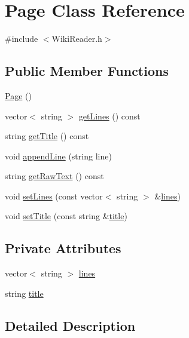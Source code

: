 \hypertarget{classPage}{\section{\-Page \-Class \-Reference}
\label{classPage}
}


{\ttfamily \#include $<$\-Wiki\-Reader.\-h$>$}

\subsection*{\-Public \-Member \-Functions}
\begin{DoxyCompactItemize}
\item 
\hyperlink{classPage_a9a7cc22d5459498ce638c54ae966c79b}{\-Page} ()
\item 
vector$<$ string $>$ \hyperlink{classPage_a89006da4b880814d0db9b994c16735a5}{get\-Lines} () const 
\item 
string \hyperlink{classPage_ad4f5e1a904a12846407e8d6ee47ddc2e}{get\-Title} () const 
\item 
void \hyperlink{classPage_a85107eca1e3f7b60bc7d0ec0283711a5}{append\-Line} (string line)
\item 
string \hyperlink{classPage_a01d4002343ca3af72cab2637778942cb}{get\-Raw\-Text} () const 
\item 
void \hyperlink{classPage_a81de048799400e4ae1b5cf2edf0b3570}{set\-Lines} (const vector$<$ string $>$ \&\hyperlink{classPage_a2a3c7d2eacadd5d336a1ff4ff771c2cc}{lines})
\item 
void \hyperlink{classPage_a79a7a53a17d2366feb75f4caac659a2a}{set\-Title} (const string \&\hyperlink{classPage_a2c1c007130225cc00393f4b92dd722d1}{title})
\end{DoxyCompactItemize}
\subsection*{\-Private \-Attributes}
\begin{DoxyCompactItemize}
\item 
vector$<$ string $>$ \hyperlink{classPage_a2a3c7d2eacadd5d336a1ff4ff771c2cc}{lines}
\item 
string \hyperlink{classPage_a2c1c007130225cc00393f4b92dd722d1}{title}
\end{DoxyCompactItemize}


\subsection{\-Detailed \-Description}


